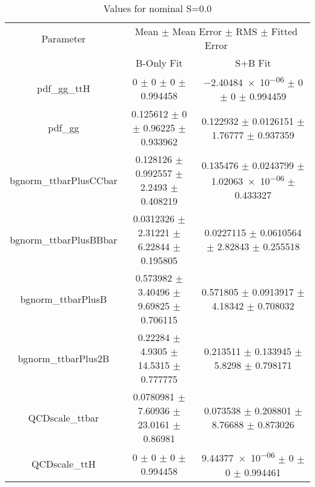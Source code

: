 \begin{table}
\centering
\caption{Values for nominal S=0.0}
\begin{tabular}{ccc}
\toprule
Parameter & \multicolumn{2}{c}{Mean $\pm$ Mean Error $\pm$ RMS $\pm$ Fitted Error}\\
 & B-Only Fit & S+B Fit\\
\midrule
pdf\_gg\_ttH & \num{0} $\pm$ \num{0} $\pm$ \num{0} $\pm$ \num{0.994458} & \num{-2.40484e-06} $\pm$ \num{0} $\pm$ \num{0} $\pm$ \num{0.994459}\\
pdf\_gg & \num{0.125612} $\pm$ \num{0} $\pm$ \num{0.96225} $\pm$ \num{0.933962} & \num{0.122932} $\pm$ \num{0.0126151} $\pm$ \num{1.76777} $\pm$ \num{0.937359}\\
bgnorm\_ttbarPlusCCbar & \num{0.128126} $\pm$ \num{0.992557} $\pm$ \num{2.2493} $\pm$ \num{0.408219} & \num{0.135476} $\pm$ \num{0.0243799} $\pm$ \num{1.02063e-06} $\pm$ \num{0.433327}\\
bgnorm\_ttbarPlusBBbar & \num{0.0312326} $\pm$ \num{2.31221} $\pm$ \num{6.22844} $\pm$ \num{0.195805} & \num{0.0227115} $\pm$ \num{0.0610564} $\pm$ \num{2.82843} $\pm$ \num{0.255518}\\
bgnorm\_ttbarPlusB & \num{0.573982} $\pm$ \num{3.40496} $\pm$ \num{9.69825} $\pm$ \num{0.706115} & \num{0.571805} $\pm$ \num{0.0913917} $\pm$ \num{4.18342} $\pm$ \num{0.708032}\\
bgnorm\_ttbarPlus2B & \num{0.22284} $\pm$ \num{4.9305} $\pm$ \num{14.5315} $\pm$ \num{0.777775} & \num{0.213511} $\pm$ \num{0.133945} $\pm$ \num{5.8298} $\pm$ \num{0.798171}\\
QCDscale\_ttbar & \num{0.0780981} $\pm$ \num{7.60936} $\pm$ \num{23.0161} $\pm$ \num{0.86981} & \num{0.073538} $\pm$ \num{0.208801} $\pm$ \num{8.76688} $\pm$ \num{0.873026}\\
QCDscale\_ttH & \num{0} $\pm$ \num{0} $\pm$ \num{0} $\pm$ \num{0.994458} & \num{9.44377e-06} $\pm$ \num{0} $\pm$ \num{0} $\pm$ \num{0.994461}\\
\bottomrule
\end{tabular}
\end{table}